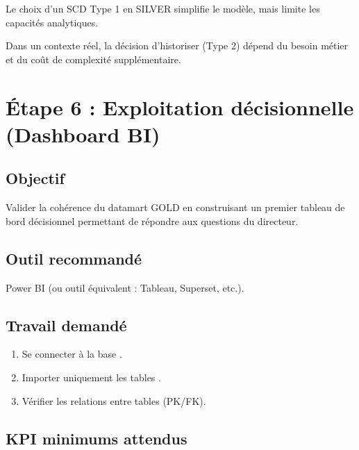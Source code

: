 \documentclass[11pt,a4paper]{article}
\begin{document}
\begin{enumerate}
\begin{tcolorbox}[title=\textbf{Stratégie SCD proposée et justification :}, colback=gray!5, colframe=black, boxrule=0.8pt, arc=2mm]
    \end{tcolorbox}

    \begin{tcolorbox}[colback=blue!5, colframe=blue!60, title=\textbf{Commentaire}]
    Le choix d’un SCD Type 1 en SILVER simplifie le modèle,
    mais limite les capacités analytiques.

    Dans un contexte réel, la décision d’historiser (Type 2)
    dépend du besoin métier et du coût de complexité supplémentaire.
    \end{tcolorbox}
\end{enumerate}



\section{Étape 6 : Exploitation décisionnelle (Dashboard BI)}

\subsection*{Objectif}

Valider la cohérence du datamart GOLD en construisant un premier
tableau de bord décisionnel permettant de répondre aux questions
du directeur.

\subsection*{Outil recommandé}

Power BI (ou outil équivalent : Tableau, Superset, etc.).

\subsection*{Travail demandé}

\begin{enumerate}
  \item Se connecter à la base .
  \item Importer uniquement les tables .
  \item Vérifier les relations entre tables (PK/FK).
\end{enumerate}

\subsection*{KPI minimums attendus}
\end{document}
